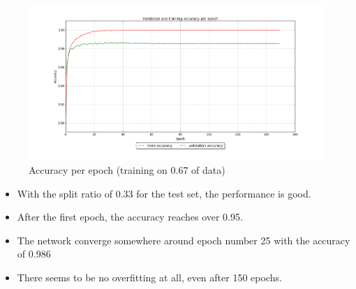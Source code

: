 \documentclass[paper=a4, fontsize=11pt]{scrartcl} %
\begin{document}
    \begin{figure}[H]
        \begin{center}
            \includegraphics[width=1.0\linewidth]{images/mnist_training_log.png}
            \caption{Accuracy per epoch (training on 0.67 of data)}
            \label{fig:train}
        \end{center}
    \end{figure}
    \begin{itemize}
        \item With the split ratio of 0.33 for the test set, the performance is good.
        \item After the first epoch, the accuracy reaches over 0.95.
        \item The network converge somewhere around epoch number 25 with the accuracy of 0.986
        \item There seems to be no overfitting at all, even after 150 epochs.
    \end{itemize}
\end{document}
